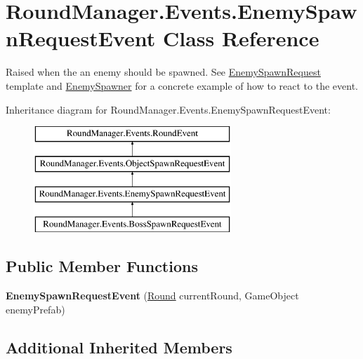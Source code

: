\hypertarget{class_round_manager_1_1_events_1_1_enemy_spawn_request_event}{}\section{Round\+Manager.\+Events.\+Enemy\+Spawn\+Request\+Event Class Reference}
\label{class_round_manager_1_1_events_1_1_enemy_spawn_request_event}


Raised when the an enemy should be spawned. See \hyperlink{class_round_manager_1_1_enemy_spawn_request}{Enemy\+Spawn\+Request} template and \hyperlink{class_round_manager_1_1_enemy_spawner}{Enemy\+Spawner} for a concrete example of how to react to the event.  


Inheritance diagram for Round\+Manager.\+Events.\+Enemy\+Spawn\+Request\+Event\+:\begin{figure}[H]
\begin{center}
\leavevmode
\includegraphics[height=4.000000cm]{class_round_manager_1_1_events_1_1_enemy_spawn_request_event}
\end{center}
\end{figure}
\subsection*{Public Member Functions}
\begin{DoxyCompactItemize}
\item 
\hypertarget{class_round_manager_1_1_events_1_1_enemy_spawn_request_event_a8d7ee95bbee4bc18d68c4c9aa559a0e5}{}{\bfseries Enemy\+Spawn\+Request\+Event} (\hyperlink{class_round_manager_1_1_round}{Round} current\+Round, Game\+Object enemy\+Prefab)\label{class_round_manager_1_1_events_1_1_enemy_spawn_request_event_a8d7ee95bbee4bc18d68c4c9aa559a0e5}

\end{DoxyCompactItemize}
\subsection*{Additional Inherited Members}


